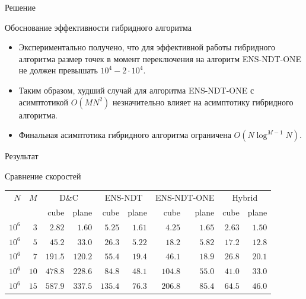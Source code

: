 \documentclass[table]{beamer}
\newcommand{\best}{\cellcolor{gray!50!white}}
\begin{document}
\begin{frame}{Решение}
\begin{block}{Обоснование эффективности гибридного алгоритма}
\begin{itemize}
\item Экспериментально получено, что для эффективной работы гибридного алгоритма размер точек в момент переключения на алгоритм ENS-NDT-ONE не должен превышать $10^4 - 2 \cdot 10^4$.
\item Таким образом, худший случай для алгоритма ENS-NDT-ONE с асимптотикой $O(MN^2)$ незначительно влияет на асимптотику гибридного алгоритма.
\item Финальная асимптотика гибридного алгоритма ограничена $O(N \log^{M-1}N)$.
\end{itemize}
\end{block}
\end{frame}

\begin{frame}{Результат}
\begin{block}{Сравнение скоростей}

\begin{center}
\begin{table}[!ht]
\begin{tabular}{rr|rr|rr|rr|rr}
$N$&$M$ & \multicolumn{2}{c|}{D\&C} 
        & \multicolumn{2}{c|}{ENS-NDT} 
        & \multicolumn{2}{c|}{ENS-NDT-ONE} 
        & \multicolumn{2}{c}{Hybrid} \\
& & {\scriptsize cube} & {\scriptsize plane} 
  & {\scriptsize cube} & {\scriptsize plane} 
  & {\scriptsize cube} & {\scriptsize plane} 
  & {\scriptsize cube} & {\scriptsize plane} \\\hline  %
      $10^6$&$3$  & $2.82$ & $1.60$ & $5.25$ & $1.61$ & $4.25$ & $1.65$ & \best $2.63$ & \best$1.50$\\\hline
      $10^6$&$5$  & $45.2$ & $33.0$ & $26.3$ & \best$5.22$ & $18.2$ & $5.82$ & \best $17.2$ & $12.8$\\\hline
      $10^6$&$7$  & $191.5$& $120.2$& $55.4$ & $19.4$ & $46.1$ & \best$18.9$ & \best $26.8$ & $20.1$\\\hline
      $10^6$&$10$ & $478.8$& $228.6$& $84.8$ & $48.1$ & $104.8$& $55.0$ & \best $41.0$ & \best $33.0$\\\hline
      $10^6$&$15$ & $587.9$& $337.5$& $135.4$& $76.3$ & $206.8$& $85.4$ & \best $64.5$ & \best $46.0$\\\hline
\end{tabular}
\end{table}
\end{center}
\end{block}
\end{frame}
\end{document}
